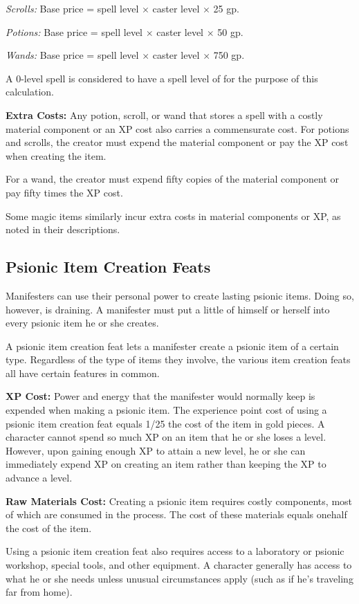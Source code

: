 \textit{Scrolls:} Base price = spell level $\times$ caster level $\times$ 25 gp.

\textit{Potions:} Base price = spell level $\times$ caster level $\times$ 50 gp.

\textit{Wands:} Base price = spell level $\times$ caster level $\times$ 750 gp.

A 0-level spell is considered to have a spell level of \onehalf for the purpose of this calculation.

\textbf{Extra Costs:} Any potion, scroll, or wand that stores a spell with a costly material component or an XP cost also carries a commensurate cost. For potions and scrolls, the creator must expend the material component or pay the XP cost when creating the item.

For a wand, the creator must expend fifty copies of the material component or pay fifty times the XP cost.

Some magic items similarly incur extra costs in material components or XP, as noted in their descriptions.


\subsection{Psionic Item Creation Feats}
Manifesters can use their personal power to create lasting psionic items. Doing so, however, is draining. A manifester must put a little of himself or herself into every psionic item he or she creates.

A psionic item creation feat lets a manifester create a psionic item of a certain type. Regardless of the type of items they involve, the various item creation feats all have certain features in common.

\textbf{XP Cost:} Power and energy that the manifester would normally keep is expended when making a psionic item. The experience point cost of using a psionic item creation feat equals 1/25 the cost of the item in gold pieces. A character cannot spend so much XP on an item that he or she loses a level. However, upon gaining enough XP to attain a new level, he or she can immediately expend XP on creating an item rather than keeping the XP to advance a level.

\textbf{Raw Materials Cost:} Creating a psionic item requires costly components, most of which are consumed in the process. The cost of these materials equals onehalf the cost of the item.

Using a psionic item creation feat also requires access to a laboratory or psionic workshop, special tools, and other equipment. A character generally has access to what he or she needs unless unusual circumstances apply (such as if he's traveling far from home).


